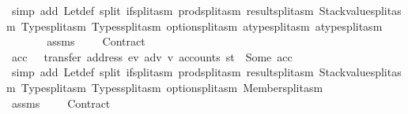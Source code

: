 \begin{isabellebody}
\ {\isacharparenleft}{\kern0pt}simp\ add{\isacharcolon}{\kern0pt}\ Let{\isacharunderscore}{\kern0pt}def\ split{\isacharcolon}{\kern0pt}\ if{\isacharunderscore}{\kern0pt}split{\isacharunderscore}{\kern0pt}asm\ prod{\isachardot}{\kern0pt}split{\isacharunderscore}{\kern0pt}asm\ result{\isachardot}{\kern0pt}split{\isacharunderscore}{\kern0pt}asm\ Stackvalue{\isachardot}{\kern0pt}split{\isacharunderscore}{\kern0pt}asm\ Type{\isachardot}{\kern0pt}split{\isacharunderscore}{\kern0pt}asm\ Types{\isachardot}{\kern0pt}split{\isacharunderscore}{\kern0pt}asm\ option{\isachardot}{\kern0pt}split{\isacharunderscore}{\kern0pt}asm\ atype{\isachardot}{\kern0pt}split{\isacharunderscore}{\kern0pt}asm\ atype{\isachardot}{\kern0pt}split{\isacharunderscore}{\kern0pt}asm{\isacharparenright}{\kern0pt}\isanewline
\ \ \ \ \isamarkupfalse%
\ \isamarkupfalse%
\ assms\ {}\ {}\ {}\ {}\ Contract\ {}\ \isamarkupfalse%
\ acc\ \ {}{\isacharcolon}{\kern0pt}\ {\isachardoublequoteopen}transfer\ {\isacharparenleft}{\kern0pt}address\ ev{\isacharparenright}{\kern0pt}\ adv\ v{\isacharprime}{\kern0pt}\ {\isacharparenleft}{\kern0pt}accounts\ st{\isacharparenright}{\kern0pt}\ {\isacharequal}{\kern0pt}\ Some\ acc{\isachardoublequoteclose}\ \isamarkupfalse%
\ {\isacharparenleft}{\kern0pt}simp\ add{\isacharcolon}{\kern0pt}\ Let{\isacharunderscore}{\kern0pt}def\ split{\isacharcolon}{\kern0pt}\ if{\isacharunderscore}{\kern0pt}split{\isacharunderscore}{\kern0pt}asm\ prod{\isachardot}{\kern0pt}split{\isacharunderscore}{\kern0pt}asm\ result{\isachardot}{\kern0pt}split{\isacharunderscore}{\kern0pt}asm\ Stackvalue{\isachardot}{\kern0pt}split{\isacharunderscore}{\kern0pt}asm\ Type{\isachardot}{\kern0pt}split{\isacharunderscore}{\kern0pt}asm\ Types{\isachardot}{\kern0pt}split{\isacharunderscore}{\kern0pt}asm\ option{\isachardot}{\kern0pt}split{\isacharunderscore}{\kern0pt}asm\ Member{\isachardot}{\kern0pt}split{\isacharunderscore}{\kern0pt}asm{\isacharparenright}{\kern0pt}\isanewline
\ \ \ \ \isamarkupfalse%
\ \isamarkupfalse%
\ assms\ {}\ {}\ {}\ {}\ Contract\ {}\ {}\ \isamarkupfalse%

\end{isabellebody}
